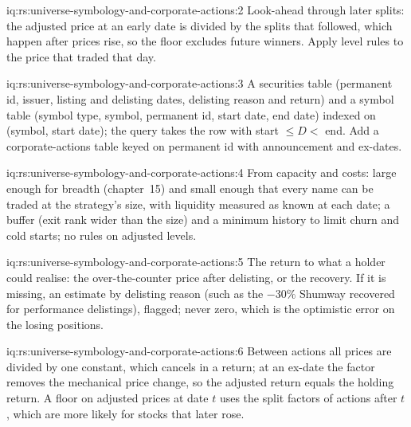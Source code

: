 \begin{solution}{iq:rs:universe-symbology-and-corporate-actions:2}
Look-ahead through later splits: the adjusted price at an early date is divided by the splits that followed, which happen after
prices rise, so the floor excludes future winners. Apply level rules to the price that traded that day.
\end{solution}

\begin{solution}{iq:rs:universe-symbology-and-corporate-actions:3}
A securities table (permanent id, issuer, listing and delisting dates, delisting reason and return) and a symbol table (symbol type,
symbol, permanent id, start date, end date) indexed on (symbol, start date); the query takes the row with start $\le D <$ end. Add a
corporate-actions table keyed on permanent id with announcement and ex-dates.
\end{solution}

\begin{solution}{iq:rs:universe-symbology-and-corporate-actions:4}
From capacity and costs: large enough for breadth (chapter~15) and small enough that every name can be traded at the strategy's
size, with liquidity measured as known at each date; a buffer (exit rank wider than the size) and a minimum history to limit churn
and cold starts; no rules on adjusted levels.
\end{solution}

\begin{solution}{iq:rs:universe-symbology-and-corporate-actions:5}
The return to what a holder could realise: the over-the-counter price after delisting, or the recovery. If it is missing, an
estimate by delisting reason (such as the $-30\%$ Shumway recovered for performance delistings), flagged; never zero, which is the
optimistic error on the losing positions.
\end{solution}

\begin{solution}{iq:rs:universe-symbology-and-corporate-actions:6}
Between actions all prices are divided by one constant, which cancels in a return; at an ex-date the factor removes the mechanical
price change, so the adjusted return equals the holding return. A floor on adjusted prices at date $t$ uses the split factors of
actions after $t$, which are more likely for stocks that later rose.
\end{solution}
